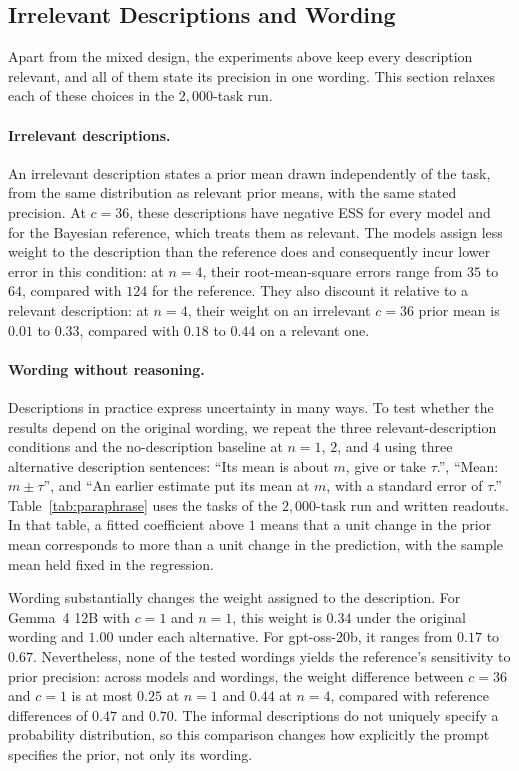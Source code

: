 \subsection{Irrelevant Descriptions and Wording}\label{sec:llm-unreliability}

Apart from the mixed design, the experiments above keep every description relevant, and all of them state its precision in one wording. This section relaxes each of these choices in the $2{,}000$-task run.

\paragraph{Irrelevant descriptions.}
An irrelevant description states a prior mean drawn independently of the task, from the same distribution as relevant prior means, with the same stated precision. At $c = 36$, these descriptions have negative ESS for every model and for the Bayesian reference, which treats them as relevant. The models assign less weight to the description than the reference does and consequently incur lower error in this condition: at $n = 4$, their root-mean-square errors range from $35$ to $64$, compared with $124$ for the reference. They also discount it relative to a relevant description: at $n = 4$, their weight on an irrelevant $c = 36$ prior mean is $0.01$ to $0.33$, compared with $0.18$ to $0.44$ on a relevant one.

\paragraph{Wording without reasoning.}
Descriptions in practice express uncertainty in many ways. To test whether the results depend on the original wording, we repeat the three relevant-description conditions and the no-description baseline at $n = 1$, $2$, and $4$ using three alternative description sentences: ``Its mean is about $m$, give or take $\tau$.'', ``Mean: $m \pm \tau$'', and ``An earlier estimate put its mean at $m$, with a standard error of $\tau$.'' Table~\ref{tab:paraphrase} uses the tasks of the $2{,}000$-task run and written readouts. In that table, a fitted coefficient above $1$ means that a unit change in the prior mean corresponds to more than a unit change in the prediction, with the sample mean held fixed in the regression.

Wording substantially changes the weight assigned to the description. For Gemma~4 12B with $c = 1$ and $n = 1$, this weight is $0.34$ under the original wording and $1.00$ under each alternative. For gpt-oss-20b, it ranges from $0.17$ to $0.67$. Nevertheless, none of the tested wordings yields the reference's sensitivity to prior precision: across models and wordings, the weight difference between $c = 36$ and $c = 1$ is at most $0.25$ at $n = 1$ and $0.44$ at $n = 4$, compared with reference differences of $0.47$ and $0.70$. The informal descriptions do not uniquely specify a probability distribution, so this comparison changes how explicitly the prompt specifies the prior, not only its wording.

